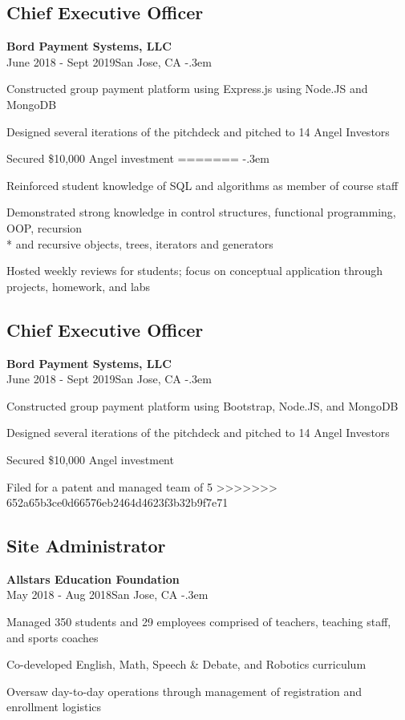 \documentclass{article}
\let\olditemize=\itemize \let\endolditemize=\enditemize
\renewenvironment{itemize}{\olditemize[topsep=0em] \itemsep-.3em}{\endolditemize}
\newcommand{\entry}[3]{\quad\textbf{#1}\\#2\qquad#3}
\begin{document}
	\subsection{Chief Executive Officer}
	\entry{Bord Payment Systems, LLC}{June 2018 - Sept 2019}{San Jose, CA}
	\begin{itemize}
		\item Constructed group payment platform using Express.js using Node.JS and MongoDB
		\item Designed several iterations of the pitchdeck and pitched to 14 Angel Investors
		\item Secured \$10,000 Angel investment
=======
	\begin{itemize}
		\item Reinforced student knowledge of SQL and
		algorithms as member of course staff
		\item Demonstrated strong knowledge in control structures, functional programming,
		OOP, recursion \\* and recursive objects, trees, iterators and generators
		\item Hosted weekly reviews for students; focus on conceptual
		application through projects, homework, and labs
	\end{itemize}
	
	\subsection{Chief Executive Officer}
	\entry{Bord Payment Systems, LLC}{June 2018 - Sept 2019}{San Jose, CA}
	\begin{itemize}
		\item Constructed group payment platform using Bootstrap, Node.JS, and MongoDB
		\item Designed several iterations of the pitchdeck and pitched to 14 Angel Investors
		\item Secured \$10,000 Angel investment
		\item Filed for a patent and managed team of 5
>>>>>>> 652a65b3ce0d66576eb2464d4623f3b32b9f7e71
	\end{itemize}
	\subsection{Site Administrator}
	\entry{Allstars Education Foundation}{May 2018 - Aug 2018}{San Jose, CA}
	\begin{itemize}
		\item Managed 350 students and 29 employees comprised of teachers, teaching staff, and sports coaches
		\item Co-developed English, Math, Speech \& Debate, and Robotics curriculum
		\item Oversaw day-to-day operations through management of registration and enrollment logistics
	\end{itemize}
	

\end{itemize}
\end{document}
